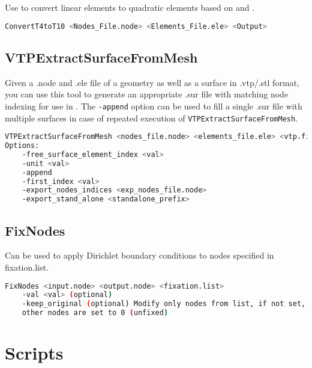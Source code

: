 Use to convert linear elements to quadratic elements based on  and .

\begin{lstlisting}[language=bash,caption=Syntax for ConvertT4toT10]
ConvertT4toT10 <Nodes_File.node> <Elements_File.ele> <Output>
\end{lstlisting}

\subsection{VTPExtractSurfaceFromMesh}
\label{tools:VTPExtractSurfaceFromMesh}

Given a .node and .ele file of a geometry as well as a surface in .vtp/.stl format, you can use this tool to generate an appropriate .sur file with matching node indexing for use in \CM.
The \verb|-append| option can be used to fill a single .sur file with multiple surfaces in case of repeated execution of \verb|VTPExtractSurfaceFromMesh|.

\begin{lstlisting}[language=bash,caption=Syntax for VTPExtractSurfaceFromMesh]
VTPExtractSurfaceFromMesh <nodes_file.node> <elements_file.ele> <vtp.file> <element_index> <surface_index> <output_prefix> 
Options:
	-free_surface_element_index <val>
	-unit <val>
	-append
	-first_index <val>
	-export_nodes_indices <exp_nodes_file.node>
	-export_stand_alone <standalone_prefix>

\end{lstlisting}

\subsection{FixNodes}
\label{tools:FixNodes}

Can be used to apply Dirichlet boundary conditions to nodes specified in fixation.list.

\begin{lstlisting}[language=bash,caption=Syntax for FixNodes]
FixNodes <input.node> <output.node> <fixation.list> 
	-val <val> (optional) 
	-keep_original (optional) Modify only nodes from list, if not set, all 
    other nodes are set to 0 (unfixed)
\end{lstlisting}


\section{Scripts}
\label{tools:Python}

